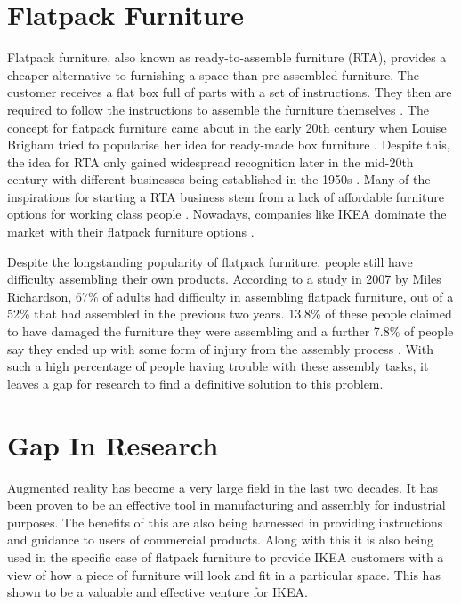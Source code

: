 \documentclass{l4proj}
\begin{document}
\section{Flatpack Furniture}

Flatpack furniture, also known as ready-to-assemble furniture (RTA), provides a cheaper alternative to furnishing a space than pre-assembled furniture. The customer receives a flat box full of parts with a set of instructions. They then are required to follow the instructions to assemble the furniture themselves \citep{fleming_ritsy_nodate}. The concept for flatpack furniture came about in the early 20th century when Louise Brigham tried to popularise her idea for ready-made box furniture \citep{lafarge_ready--assemble_2019}. Despite this, the idea for RTA only gained widespread recognition later in the mid-20th century with different businesses being established in the 1950s \citep{lafarge_ready--assemble_2019}. Many of the inspirations for starting a RTA business stem from a lack of affordable furniture options for working class people \citep{lafarge_ready--assemble_2019}. Nowadays, companies like IKEA dominate the market with their flatpack furniture options \citep{statista_topic_2023}.

Despite the longstanding popularity of flatpack furniture, people still have difficulty assembling their own products. According to a study in 2007 by Miles Richardson, 67\% of adults had difficulty in assembling flatpack furniture, out of a 52\% that had assembled in the previous two years. 13.8\% of these people claimed to have damaged the furniture they were assembling and a further 7.8\% of people say they ended up with some form of injury from the assembly process \citep{Richardson11}. With such a high percentage of people having trouble with these assembly tasks, it leaves a gap for research to find a definitive solution to this problem.

\section{Gap In Research}

Augmented reality has become a very large field in the last two decades. It has been proven to be an effective tool in manufacturing and assembly for industrial purposes. The benefits of this are also being harnessed in providing instructions and guidance to users of commercial products. Along with this it is also being used in the specific case of flatpack furniture to provide IKEA customers with a view of how a piece of furniture will look and fit in a particular space. This has shown to be a valuable and effective venture for IKEA. 
\end{document}
